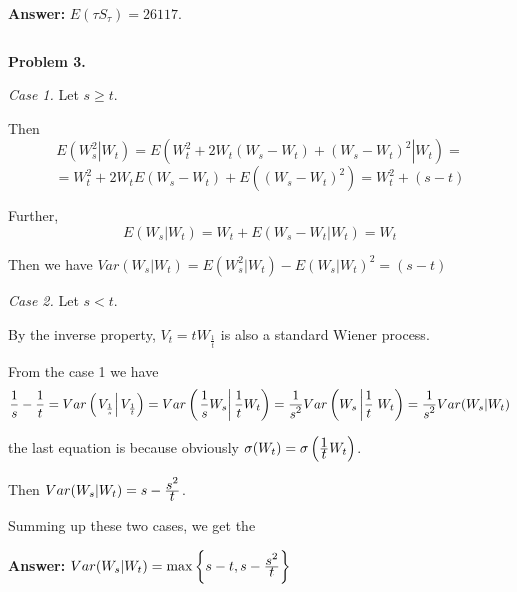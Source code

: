 \documentclass[pdftex,12pt,a4paper]{article}
\begin{document}
\textbf{Answer:} $E(\tau S_{\tau}) = 26117$.
\[\]\par
\[\]\par

\textbf{Problem 3.}\par
\textit{Case 1.} Let $s \geqslant t$.\par
Then
$$
E\left(\left.W_{s}^{2}\right| W_{t}\right) = E\left(\left.W_{t}^{2} + 2 W_{t}(W_{s} - W_{t}) + (W_{s} - W_{t})^{2} \right| W_{t}\right) =$$ $$= W_{t}^{2} + 2W_{t}E(W_{s} - W_{t}) + E\left((W_{s} - W_{t})^{2}\right) = W_{t}^{2} + (s-t)
$$\par
Further,
$$
E(W_{s} | W_{t}) = W_{t} + E(W_{s} - W_{t}| W_{t}) = W_{t}
$$
\par
Then we have $Var(W_{s}|W_{t}) = E(W_{s}^{2}| W_{t}) - E(W_{s}|W_{t})^{2} = (s-t)$\[\]\par
\textit{Case 2.} Let $s < t$.\par
By the inverse property, $V_{t} = tW_{\frac{1}{t}}$ is also a standard Wiener process.\par
From the case 1 we have
$$
\frac{\displaystyle 1}{\displaystyle s} - \frac{\displaystyle 1}{\displaystyle t} = Var\left(\left.V_{\frac{1}{s}}\right| V_{\frac{1}{t}}\right) = Var\left(\left.\frac{\displaystyle 1}{\displaystyle s}W_{s}\right| \frac{\displaystyle 1}{\displaystyle t}W_{t}\right) = \frac{\displaystyle 1}{\displaystyle s^{2}} Var\left(W_{s}\left|\frac{\displaystyle 1}{\displaystyle t}\right.W_{t}\right) = \frac{\displaystyle 1}{\displaystyle s^{2}}Var(W_{s}| W_{t})
$$\par
the last equation is because obviously $\sigma(W_{t}) = \sigma\left(\frac{\displaystyle 1}{\displaystyle t}W_{t}\right)$.\par
Then $Var(W_{s}| W_{t}) = s - \frac{\displaystyle s^{2}}{\displaystyle t}$.\[\]\par
Summing up these two cases, we get the\[\]\par
\textbf{Answer:} $Var(W_{s}| W_{t}) = \max\left\{s-t, s - \frac{\displaystyle s^{2}}{\displaystyle t}\right\}$
\end{document}
